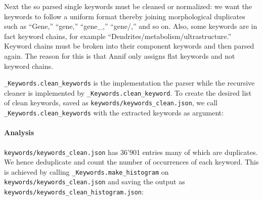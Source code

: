 Next the so parsed single keywords must be cleaned or normalized: we
want the keywords to follow a uniform format thereby joining
morphological duplicates such as ``Gene,'' ``gene,'' ``gene\_,''
``gene/,'' and so on. Also, some keywords are in fact keyword chains,
for example ``Dendrites/metabolism/ultrastructure.'' Keyword chains must
be broken into their component keywords and then parsed again. The
reason for this is that Annif only assigns flat keywords and not keyword
chains.

\texttt{\_Keywords.clean\_keywords} is the implementation the parser
while the recursive cleaner is implemented by
\texttt{\_Keywords.clean\_keyword}. To create the desired list of clean
keywords, saved as \texttt{keywords/keywords\_clean.json}, we call
\texttt{\_Keywords.clean\_keywords} with the extracted keywords as
argument:

\begin{Shaded}
\begin{Highlighting}[]
\OperatorTok{=}\OperatorTok{+} \NormalTok{)}
\OperatorTok{=}
\OperatorTok{+} \NormalTok{)}
\end{Highlighting}
\end{Shaded}

\hypertarget{analysis-1}{%
\paragraph{Analysis}\label{analysis-1}}

\texttt{keywords/keywords\_clean.json} has 36'901 entries many of which
are duplicates. We hence deduplicate and count the number of occurrences
of each keyword. This is achieved by calling
\texttt{\_Keywords.make\_histogram} on
\texttt{keywords/keywords\_clean.json} and saving the output as
\texttt{keywords/keywords\_clean\_histogram.json}:

\begin{Shaded}
\begin{Highlighting}[]
\OperatorTok{=}\OperatorTok{+} \NormalTok{)}
\OperatorTok{=}
\OperatorTok{+} \NormalTok{)}
\end{Highlighting}
\end{Shaded}

